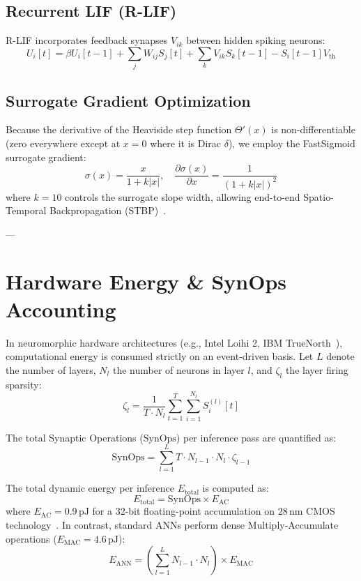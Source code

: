 \documentclass[journal,compsoc]{IEEEtran}
\begin{document}
\subsection{Recurrent LIF (R-LIF)}
R-LIF incorporates feedback synapses $V_{ik}$ between hidden spiking neurons:
\begin{equation}
U_i[t] = \beta U_i[t-1] + \sum_{j} W_{ij} S_j[t] + \sum_{k} V_{ik} S_k[t-1] - S_i[t-1] V_{\text{th}}
\end{equation}

\subsection{Surrogate Gradient Optimization}
Because the derivative of the Heaviside step function $\Theta'(x)$ is non-differentiable (zero everywhere except at $x=0$ where it is Dirac $\delta$), we employ the FastSigmoid surrogate gradient:
\begin{equation}
\sigma(x) = \frac{x}{1 + k |x|}, \quad \frac{\partial \sigma(x)}{\partial x} = \frac{1}{(1 + k |x|)^2}
\end{equation}
where $k=10$ controls the surrogate slope width, allowing end-to-end Spatio-Temporal Backpropagation (STBP)~\cite{neftci2019surrogate,zenke2021remarkable}.

---

\section{Hardware Energy & SynOps Accounting}

In neuromorphic hardware architectures (e.g., Intel Loihi 2, IBM TrueNorth~\cite{davies2018loihi,merolla2014million}), computational energy is consumed strictly on an event-driven basis. Let $L$ denote the number of layers, $N_l$ the number of neurons in layer $l$, and $\zeta_l$ the layer firing sparsity:
\begin{equation}
\zeta_l = \frac{1}{T \cdot N_l} \sum_{t=1}^{T} \sum_{i=1}^{N_l} S_i^{(l)}[t]
\end{equation}

The total Synaptic Operations ($\text{SynOps}$) per inference pass are quantified as:
\begin{equation}
\text{SynOps} = \sum_{l=1}^{L} T \cdot N_{l-1} \cdot N_l \cdot \zeta_{l-1}
\end{equation}

The total dynamic energy per inference $E_{\text{total}}$ is computed as:
\begin{equation}
E_{\text{total}} = \text{SynOps} \times E_{\text{AC}}
\end{equation}
where $E_{\text{AC}} = 0.9\,\text{pJ}$ for a 32-bit floating-point accumulation on $28\,\text{nm}$ CMOS technology~\cite{horowitz20141}. In contrast, standard ANNs perform dense Multiply-Accumulate operations ($E_{\text{MAC}} = 4.6\,\text{pJ}$):
\begin{equation}
E_{\text{ANN}} = \left( \sum_{l=1}^{L} N_{l-1} \cdot N_l \right) \times E_{\text{MAC}}
\end{equation}
\end{document}
